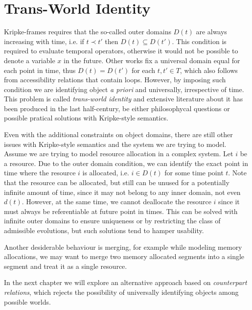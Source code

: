 \section{Trans-World Identity}

Kripke-frames requires that the so-called outer domains $D(t)$ are always increasing with time, i.e. if $t \prec t'$
then $D(t) \subseteq D(t')$. This condition is required to evaluate temporal operators, otherwise it would not be
possible to denote a variable $x$ in the future. Other works fix a universal domain equal for each point in time, thus
$D(t) = D(t')$ for each $t, t' \in T$, which also follows from accessibility relations that contain loops.
However, by imposing such condition we are identifying object \emph{a priori}
and universally, irrespective of time. This problem is called \emph{trans-world identity} and extensive literature about
it has been produced in the last half-century, be either philosophycal questions or possible pratical solutions with
Kripke-style semantics.

Even with the additional constraints on object domains, there are still other issues with Kripke-style semantics and the
system we are trying to model. Assume we are trying to model resource allocation in a complex system. Let $i$ be a
resource. Due to the outer domain condition, we can identify the exact point in time where the resource $i$ is
allocated, i.e. $i \in D(t)$ for some time point $t$. Note that the resource can be allocated, but still can be unused
for a potentially infinite amount of time, since it may not belong to any inner domain, not even $d(t)$. However, at the
same time, we cannot deallocate the resource $i$ since it must always be referentiable at future point in times. This
can be solved with infinite outer domains to ensure uniqueness or by restricting the class of admissible evolutions, but
such solutions tend to hamper usability.

Another desiderable behaviour is merging, for example while modeling memory allocations, we may want to merge two memory
allocated segments into a single segment and treat it as a single resource.

In the next chapter we will explore an alternative approach based on \emph{counterpart relations}, which rejects the
possibility of universally identifying objects among possible worlds.
